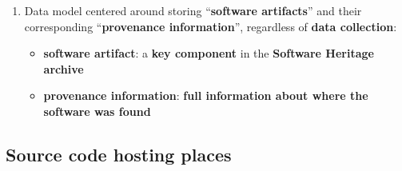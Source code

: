 \documentclass[11pt]{article}
\providecommand{\tightlist}{%
      \setlength{\itemsep}{0pt}\setlength{\parskip}{0pt}}
\begin{document}
\begin{enumerate}
\def\labelenumi{\arabic{enumi}.}
\tightlist
\item
  Data model centered around storing ``\textbf{software artifacts}'' and
  their corresponding ``\textbf{provenance information}'', regardless of
  \textbf{data collection}:

  \begin{itemize}
  \tightlist
  \item
    \textbf{software artifact}: a \textbf{key component} in the
    \textbf{Software Heritage archive}
  \item
    \textbf{provenance information}: \textbf{full information about
    where the software was found}
  \end{itemize}
\end{enumerate}

\hypertarget{source-code-hosting-places}{%
\subsection{Source code hosting
places}\label{source-code-hosting-places}}
\end{document}
